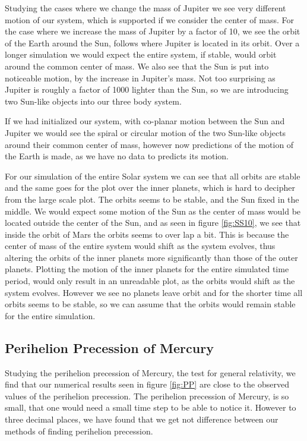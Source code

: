 \documentclass[%
reprint,
nofootinbib,
amsmath,amssymb,
aps,
]{revtex4-1}
\begin{document}
Studying the cases where we change the mass of Jupiter we see very different motion of our system, which is supported if we consider the center of mass. For the case where we increase the mass of Jupiter by a factor of 10, we see the orbit of the Earth around the Sun, follows where Jupiter is located in its orbit. Over a longer simulation we would expect the entire system, if stable, would orbit around the common center of mass. We also see that the Sun is put into noticeable motion, by the increase in Jupiter's mass. Not too surprising as Jupiter is roughly a factor of 1000 lighter than the Sun, so we are introducing two Sun-like objects into our three body system. 

If we had initialized our system, with co-planar motion between the Sun and Jupiter we would see the spiral or circular motion of the two Sun-like objects around their common center of mass, however now predictions of the motion of the Earth is made, as we have no data to predicts its motion. 


For our simulation of the entire Solar system we can see that all orbits are stable and the same goes for the plot over the inner planets, which is hard to decipher from the large scale plot. The orbits seems to be stable, and the Sun fixed in the middle. We would expect some motion of the Sun as the center of mass would be located outside the center of the Sun, and as seen in figure \ref{fig:SS10}, we see that inside the orbit of Mars the orbits seems to over lap a bit. This is because the center of mass of the entire system would shift as the system evolves, thus altering the orbits of the inner planets more significantly than those of the outer planets. Plotting the motion of the inner planets for the entire simulated time period, would only result in an unreadable plot, as the orbits would shift as the system evolves. However we see no planets leave orbit and for the shorter time all orbits seems to be stable, so we can assume that the orbits would remain stable for the entire simulation.
\subsection{Perihelion Precession of Mercury} %
Studying the perihelion precession of Mercury, the test for general relativity, we find that our numerical results seen in figure \ref{fig:PP} are close to the observed values of the perihelion precession. The perihelion precession of Mercury, is so small, that one would need a small time step to be able to notice it. However to three decimal places, we have found that we get not difference between our methods of finding perihelion precession. 
\end{document}
